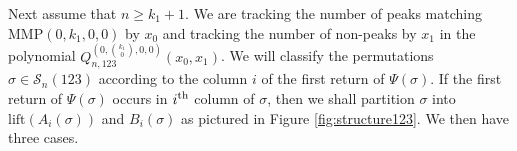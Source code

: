 \documentclass[
final,nomarks
]{dmtcs-episciences}
\newcommand{\fref}[1]{Figure \ref{fig:#1}}
\newcommand{\Sn}[1]{\mathcal{S}_{#1}}
\newcommand{\Qmzn}[3]{Q_{#3,123}^{(0,\binom{#1}{#2},0,0)}(x_0,x_1)}
\newcommand{\MMP}{\mathrm{MMP}}
\newcommand{\thn}[1]{\begin{math}#1^\textnormal{th}\end{math}}
\begin{document}
Next assume that \begin{math}n \geq k_1 +1\end{math}. 
We are tracking the number of peaks matching \begin{math}\MMP(0,k_1,0,0)\end{math} by \begin{math}x_0\end{math} and tracking the number of non-peaks by \begin{math}x_1\end{math} in the polynomial \begin{math}\Qmzn{k_1}{0}{n}\end{math}. We will classify the permutations \begin{math}\sigma\in\Sn{n}(123)\end{math} 
according to the column \begin{math}i\end{math} of the first return of \begin{math}\Psi(\sigma)\end{math}. If 
the first return of \begin{math}\Psi(\sigma)\end{math} occurs in \thn{i} column of \begin{math}\sigma\end{math}, then 
we shall partition \begin{math}\sigma\end{math} into \begin{math}\mathrm{lift}(A_i(\sigma))\end{math} and \begin{math}B_i(\sigma)\end{math} 
as pictured in \fref{structure123}. We then have three cases. 
\end{document}
